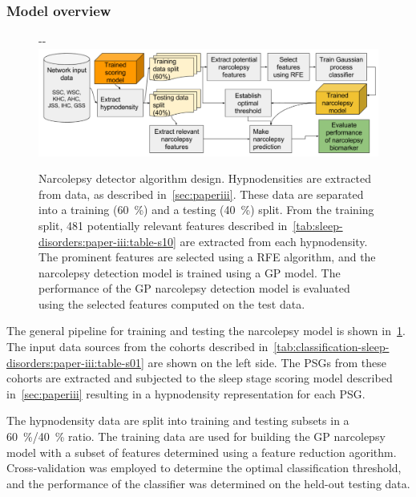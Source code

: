 \subsubsection{Model overview}

\begin{figure}
    \begin{adjustwidth*}{}{-\marginparwidth-\marginparsep}
        \includegraphics[width=\textwidth+\marginparwidth+\marginparsep]{figures/paper-iii/Figure_5c.png}
        \caption[Narcolepsy detector algorithm design]{Narcolepsy detector algorithm design. Hypnodensities are extracted from data, as described in~\cref{sec:paperiii}. 
        These data are separated into a training (\SI{60}{\percent}) and a testing (\SI{40}{\percent}) split. 
        From the training split, 481 potentially relevant features described in~\cref{tab:sleep-disorders:paper-iii:table-s10} are extracted from each hypnodensity. 
        The prominent features are selected using a \ac{RFE} algorithm, and the narcolepsy detection model is trained using a \ac{GP} model.
        The performance of the \ac{GP} narcolepsy detection  model is evaluated using the selected features computed on the test data.}
        \label{fig:paperiii-figure5c}
    \end{adjustwidth*}
\end{figure}

The general pipeline for training and testing the narcolepsy model is shown in~\cref{fig:paperiii-figure5c}.
The input data sources from the cohorts described in~\cref{tab:classification-sleep-disorders:paper-iii:table-s01} are shown on the left side.
The \acp{PSG} from these cohorts are extracted and subjected to the sleep stage scoring model described in~\cref{sec:paperiii} resulting in a hypnodensity representation for each \ac{PSG}.

The hypnodensity data are split into training and testing subsets in a \SI{60}{\percent}/\SI{40}{\percent} ratio.
The training data are used for building the \ac{GP} narcolepsy model with a subset of features determined using a feature reduction agorithm.
Cross-validation was employed to determine the optimal classification threshold, and the performance of the classifier was determined on the held-out testing data.

